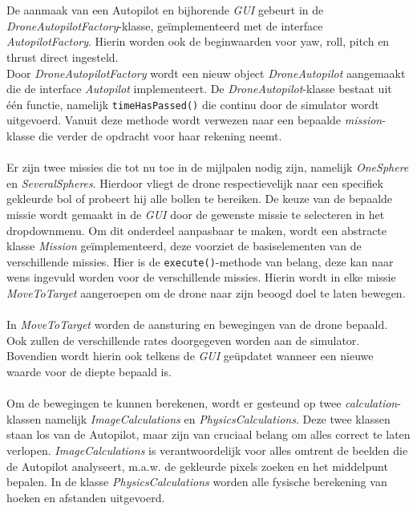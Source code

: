 \\
\\
De aanmaak van een Autopilot en bijhorende \textit{GUI} gebeurt in de \textit{DroneAutopilotFactory}-klasse, ge\"implementeerd met de interface \textit{AutopilotFactory}. Hierin worden ook de beginwaarden voor yaw, roll, pitch en thrust direct ingesteld. 
\\
Door \textit{DroneAutopilotFactory} wordt een nieuw object \textit{DroneAutopilot} aangemaakt die de interface \textit{Autopilot} implementeert. De \textit{DroneAutopilot}-klasse bestaat uit één functie, namelijk \texttt{timeHasPassed()} die continu door de simulator wordt uitgevoerd. Vanuit deze methode wordt verwezen naar een bepaalde \textit{mission}-klasse die verder de opdracht voor haar rekening neemt.
\\
\\
Er zijn twee missies die tot nu toe in de mijlpalen nodig zijn, namelijk \textit{OneSphere} en \textit{SeveralSpheres}. Hierdoor vliegt de drone respectievelijk naar een specifiek gekleurde bol of probeert hij alle bollen te bereiken. De keuze van de bepaalde missie wordt gemaakt in de \textit{GUI} door de gewenste missie te selecteren in het dropdownmenu. Om dit onderdeel aanpasbaar te maken, wordt een abstracte klasse \textit{Mission} ge\"implementeerd, deze voorziet de basiselementen van de verschillende missies. Hier is de \texttt{execute()}-methode van belang, deze kan naar wens ingevuld worden voor de verschillende missies. Hierin wordt in elke missie \textit{MoveToTarget} aangeroepen om de drone naar zijn beoogd doel te laten bewegen.
\\
\\
In \textit{MoveToTarget} worden de aansturing en bewegingen van de drone bepaald. Ook zullen de verschillende rates doorgegeven worden aan de simulator. Bovendien wordt hierin ook telkens de \textit{GUI} ge\"updatet wanneer een nieuwe waarde voor de diepte bepaald is.
\\
\\
Om de bewegingen te kunnen berekenen, wordt er gesteund op twee \textit{calculation}-klassen namelijk \textit{ImageCalculations} en \textit{PhysicsCalculations}. Deze twee klassen staan los van de Autopilot, maar zijn van cruciaal belang om alles correct te laten verlopen. \textit{ImageCalculations} is verantwoordelijk voor alles omtrent de beelden die de Autopilot analyseert, m.a.w. de gekleurde pixels zoeken en het middelpunt bepalen.
In de klasse \textit{PhysicsCalculations} worden alle fysische berekening van hoeken en afstanden uitgevoerd.
